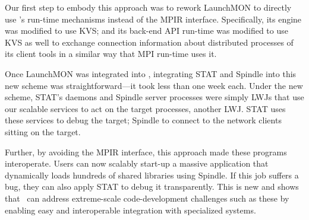 Our first step to embody this approach was to rework LaunchMON
to directly use \flux's run-time mechanisms instead 
of the MPIR interface. Specifically, its engine
was modified to use KVS; and its back-end 
API run-time was modified to use KVS as well 
to exchange connection information about 
distributed processes of its client tools in a similar way that MPI run-time 
uses it. 

Once LaunchMON was integrated into \flux, integrating 
STAT and {\sc Spindle} into this new scheme was 
straightforward---it took less than one week each.
Under the new scheme, STAT's daemons 
and {\sc Spindle} server processes were simply LWJs 
that use our scalable services to act on the target processes, 
another LWJ. STAT uses these services to debug the 
target; {\sc Spindle} to connect to the network clients sitting on the target.

Further, by avoiding the MPIR interface, 
this approach made these programs interoperate.
Users can now scalably start-up a massive application 
that dynamically loads hundreds of shared libraries 
using {\sc Spindle}.
If this job suffers a bug, they can also apply
STAT to debug it transparently.
This is new and shows that \flux\ can address extreme-scale 
code-development challenges such as these by enabling easy and interoperable 
integration with specialized systems. 
